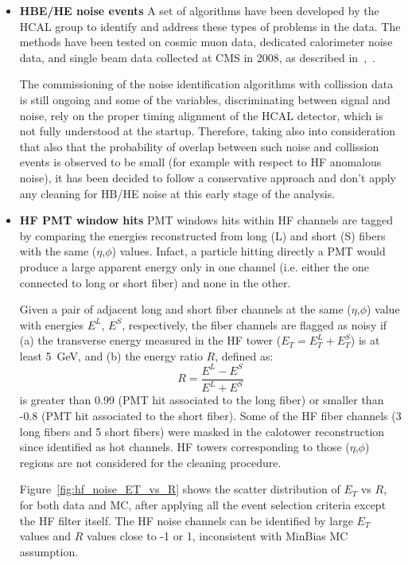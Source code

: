 \begin{itemize}
%
\item{\bf HBE/HE noise events} A set of algorithms have been developed by the HCAL group to 
identify and address these types of problems in the data. The methods have been tested on cosmic muon data, 
dedicated calorimeter noise data, and single beam data collected at CMS in 2008, 
as described in~\cite{Chatrchyan:1225105},~\cite{HCALNoiseTwiki}.  

The commissioning of the noise identification algorithms with collission data is still 
ongoing and some of the variables, discriminating between signal and noise, rely on the proper 
timing alignment of the HCAL detector, which is not fully understood at the startup.
Therefore, taking also into consideration that also that the probability of overlap between such noise and 
collission events is observed to be small (for example with respect to HF anomalous noise), 
it has been decided to follow a conservative approach and don't apply any cleaning for HB/HE noise 
at this early stage of the analysis.
%
\item{\bf HF PMT window hits} PMT windows hits within HF channels are tagged by comparing 
the energies reconstructed from long (L) and short (S) fibers with the same ($\eta$,$\phi$) values. 
Infact, a particle hitting directly a PMT would produce a large apparent energy only in one channel 
(i.e. either the one connected to long or short fiber) and none in the other.

Given a pair of adjacent long and short fiber channels at the same ($\eta$,$\phi$) value 
with energies $E^L$, $E^S$, respectively, the fiber channels are flagged as noisy if 
(a) the transverse energy measured in the HF tower ($E_T=E_T^L+E_T^S$) is at least 5~GeV, 
and (b) the energy ratio $R$, defined as:
%
\begin{equation}
R = \frac{E^L - E^S}{E^L + E^S}
\end{equation}
%
is greater than 0.99 (PMT hit associated to the long fiber) 
or smaller than -0.8 (PMT hit associated to the short fiber).
Some of the HF fiber channels (3 long fibers and 5 short fibers) 
were masked in the calotower reconstruction since identified as hot channels.
HF towers corresponding to those ($\eta$,$\phi$) regions are not considered for 
the cleaning procedure.
 
Figure~\ref{fig:hf_noise_ET_vs_R} shows the scatter distribution of $E_T$ vs $R$, 
for both data and MC, after applying all the event selection criteria except 
the HF filter itself. The HF noise channels can be identified by 
large $E_T$ values and $R$ values close to -1 or 1, 
inconsistent with MinBias MC assumption.


\end{itemize}
